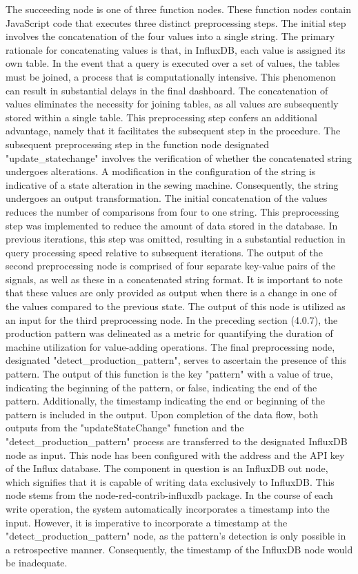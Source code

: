 The succeeding node is one of three function nodes. These function nodes contain JavaScript code that executes three distinct preprocessing steps. The initial step involves the concatenation of the four values into a single string. The primary rationale for concatenating values is that, in InfluxDB, each value is assigned its own table. In the event that a query is executed over a set of values, the tables must be joined, a process that is computationally intensive. This phenomenon can result in substantial delays in the final dashboard. The concatenation of values eliminates the necessity for joining tables, as all values are subsequently stored within a single table.
This preprocessing step confers an additional advantage, namely that it facilitates the subsequent step in the procedure. The subsequent preprocessing step in the function node designated "update\_statechange" involves the verification of whether the concatenated string undergoes alterations. A modification in the configuration of the string is indicative of a state alteration in the sewing machine. Consequently, the string undergoes an output transformation. The initial concatenation of the values reduces the number of comparisons from four to one string. This preprocessing step was implemented to reduce the amount of data stored in the database. In previous iterations, this step was omitted, resulting in a substantial reduction in query processing speed relative to subsequent iterations. The output of the second preprocessing node is comprised of four separate key-value pairs of the signals, as well as these in a concatenated string format. It is important to note that these values are only provided as output when there is a change in one of the values compared to the previous state. The output of this node is utilized as an input for the third preprocessing node.
In the preceding section (4.0.7), the production pattern was delineated as a metric for quantifying the duration of machine utilization for value-adding operations. The final preprocessing node, designated "detect\_production\_pattern", serves to ascertain the presence of this pattern. The output of this function is the key "pattern" with a value of true, indicating the beginning of the pattern, or false, indicating the end of the pattern. Additionally, the timestamp indicating the end or beginning of the pattern is included in the output.
Upon completion of the data flow, both outputs from the "updateStateChange" function and the "detect\_production\_pattern" process are transferred to the designated InfluxDB node as input. This node has been configured with the address and the API key of the Influx database. The component in question is an InfluxDB out node, which signifies that it is capable of writing data exclusively to InfluxDB. This node stems from the node-red-contrib-influxdb package. In the course of each write operation, the system automatically incorporates a timestamp into the input. However, it is imperative to incorporate a timestamp at the "detect\_production\_pattern" node, as the pattern's detection is only possible in a retrospective manner. Consequently, the timestamp of the InfluxDB node would be inadequate.

